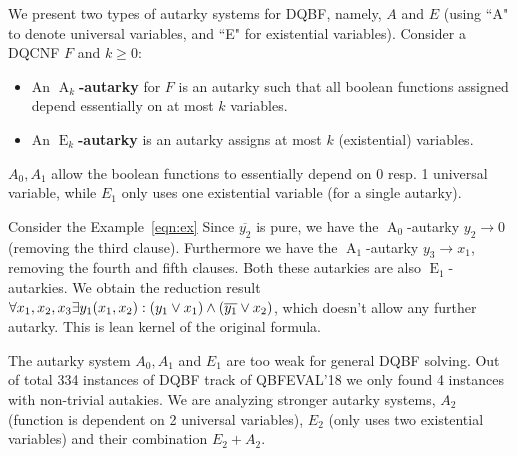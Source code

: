 \documentclass[conference]{IEEEtran}
\DeclareMathOperator{\Aaut}{A}
\DeclareMathOperator{\Eaut}{E}
\begin{document}
We present two types of autarky systems for DQBF, namely, $A$ and $E$ (using ``A" to denote universal variables, and ``E" for existential variables).
%
Consider a DQCNF $F$ and $k \ge 0$:
\begin{itemize}
	\item An \textbf{$\Aaut_k$-autarky} for $F$ is an autarky such that all boolean functions assigned depend essentially on at most $k$ variables.
	\item An \textbf{$\Eaut_k$-autarky} is an autarky assigns at most $k$ (existential) variables.
\end{itemize}

$A_0, A_1$ allow the boolean functions to essentially depend on 0 resp. 1 universal variable, while $E_1$ only uses one existential variable (for a single autarky).
%

Consider the Example~\ref{eqn:ex}
Since $\overline{y_2}$ is pure, we have the $\Aaut_0$-autarky $y_2 \rightarrow 0$ (removing the third clause).
Furthermore we have the $\Aaut_1$-autarky $y_3 \rightarrow x_1$, removing the fourth and fifth clauses.
Both these autarkies are also $\Eaut_1$-autarkies.
We obtain the reduction result $\forall x_1,x_2,x_3 \exists y_1(x_1,x_2) : (y_1 \vee x_1) \wedge (\overline{y_1} \vee x_2)$, 
which doesn't allow any further autarky. 
%
This is lean kernel of the original formula.

The autarky system $A_0, A_1$ and $E_1$ are too weak for general DQBF solving. Out of total 334 instances of DQBF track of QBFEVAL'18 we only found 4 instances with non-trivial autakies. We are analyzing stronger autarky systems, $A_2$ (function is dependent on 2 universal variables), $E_2$ (only uses two existential variables) and their combination $E_2 + A_2$. 
%
\end{document}
